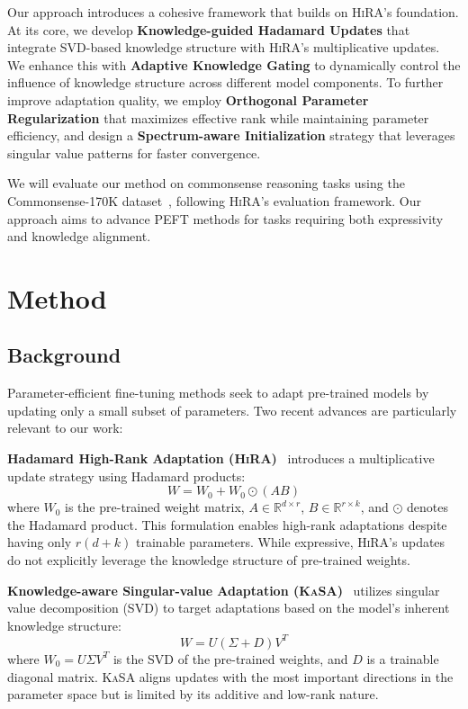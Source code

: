 \documentclass[10pt,letterpaper]{article}
\begin{document}
Our approach introduces a cohesive framework that builds on \textsc{HiRA}'s foundation. At its core, we develop \textbf{Knowledge-guided Hadamard Updates} that integrate SVD-based knowledge structure with \textsc{HiRA}'s multiplicative updates. We enhance this with \textbf{Adaptive Knowledge Gating} to dynamically control the influence of knowledge structure across different model components. To further improve adaptation quality, we employ \textbf{Orthogonal Parameter Regularization} that maximizes effective rank while maintaining parameter efficiency, and design a \textbf{Spectrum-aware Initialization} strategy that leverages singular value patterns for faster convergence.

We will evaluate our method on commonsense reasoning tasks using the Commonsense-170K dataset~\cite{llm-adapters}, following \textsc{HiRA}'s evaluation framework. Our approach aims to advance PEFT methods for tasks requiring both expressivity and knowledge alignment.

\section{Method}

\subsection{Background}

Parameter-efficient fine-tuning methods seek to adapt pre-trained models by updating only a small subset of parameters. Two recent advances are particularly relevant to our work:

\textbf{Hadamard High-Rank Adaptation (\textsc{HiRA})}~\cite{huang2025hira} introduces a multiplicative update strategy using Hadamard products:
\begin{equation}
    W = W_0 + W_0 \odot (AB)
\end{equation}
where $W_0$ is the pre-trained weight matrix, $A \in \mathbb{R}^{d \times r}$, $B \in \mathbb{R}^{r \times k}$, and $\odot$ denotes the Hadamard product. This formulation enables high-rank adaptations despite having only $r(d+k)$ trainable parameters. While expressive, \textsc{HiRA}'s updates do not explicitly leverage the knowledge structure of pre-trained weights.

\textbf{Knowledge-aware Singular-value Adaptation (\textsc{KaSA})}~\cite{wang2024kasa} utilizes singular value decomposition (SVD) to target adaptations based on the model's inherent knowledge structure:
\begin{equation}
    W = U(\Sigma + D)V^T
\end{equation}
where $W_0 = U\Sigma V^T$ is the SVD of the pre-trained weights, and $D$ is a trainable diagonal matrix. \textsc{KaSA} aligns updates with the most important directions in the parameter space but is limited by its additive and low-rank nature.
\end{document}
